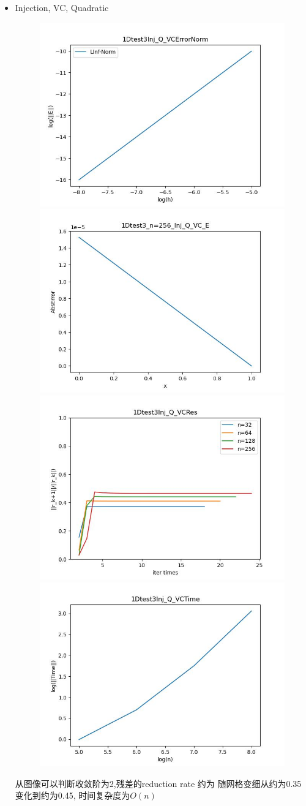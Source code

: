 \documentclass{article}
\begin{document}
\begin{itemize}
    \item Injection, VC, Quadratic
    \begin{figure}[h]
        \centering
        \includegraphics[width=0.35\linewidth]{1Dtest3Inj_Q_VCErrorNorm.jpg}
        \includegraphics[width=0.35\linewidth]{1Dtest3_n=256_Inj_Q_VC_E.jpg}
        \includegraphics[width=0.35\linewidth]{1Dtest3Inj_Q_VCRes.jpg}
        \includegraphics[width=0.35\linewidth]{1Dtest3Inj_Q_VCTime.jpg}
    \end{figure}
    
    从图像可以判断收敛阶为2,残差的reduction rate 约为 随网格变细从约为0.35变化到约为0.45, 时间复杂度为$O(n)$
    \newpage
\end{itemize}
\end{document}
